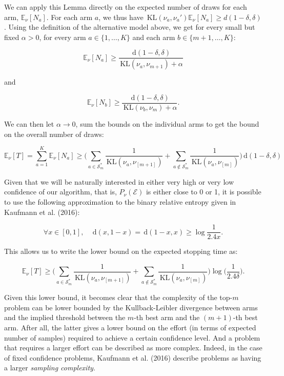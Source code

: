 \documentclass[11pt,]{article}
\newcommand{\KL}{\,\text{KL}}
\newcommand{\der}{\,\text{d}}
\begin{document}
We can apply this Lemma directly on the expected number of draws for
each arm, \(\mathbb{E}_{\nu}[N_a]\). For each arm \(a\), we thus have
\(\KL(\nu_a, \nu_a') \mathbb{E}_{\nu}[N_a] \geq d(1-\delta, \delta)\).
Using the definition of the alternative model above, we get for every
small but fixed \(\alpha > 0\), for every arm \(a \in \{1, \dots, K\}\)
and each arm \(b \in \{m+1, \dots, K\}\):

\begin{equation*}
\mathbb{E}_{\nu}[N_a] \geq \frac{\der(1-\delta, \delta)}{\KL (\nu_a, \nu_{m+1}) + \alpha}
\end{equation*}

and

\begin{equation*}
\mathbb{E}_{\nu}[N_b] \geq \frac{\der(1-\delta, \delta)}{\KL (\nu_b, \nu_{m}) + \alpha}.
\end{equation*}

We can then let \(\alpha \to 0\), sum the bounds on the individual arms
to get the bound on the overall number of draws:

\begin{equation*}
\mathbb{E}_{\nu}[T] = \sum_{a=1}^K \mathbb{E}_{\nu}[N_a] \geq \Big( \sum_{a \in \mathcal{S}_m^*} \frac{1}{\KL(\nu_a, \nu_{[m+1]})} + \sum_{a \notin \mathcal{S}_m^*} \frac{1}{\KL(\nu_a, \nu_{[m]})} \Big) \der(1-\delta, \delta)
\end{equation*}

Given that we will be naturally interested in either very high or very
low confidence of our algorithm, that is, \(P_\nu(\mathcal{E})\) is
either close to 0 or 1, it is possible to use the following
approximation to the binary relative entropy given in Kaufmann et al.
(2016):

\begin{equation}\label{bre_approx}
\forall x \in [0,1], \quad \der(x,1-x) = \der(1-x,x) \geq \log \frac{1}{2.4x}.
\end{equation}

This allows us to write the lower bound on the expected stopping time
as:

\begin{equation*}
\mathbb{E}_{\nu}[T] \geq \Big( \sum_{a \in \mathcal{S}_m^*} \frac{1}{\KL(\nu_a, \nu_{[m+1]})} + \sum_{a \notin \mathcal{S}_m^*} \frac{1}{\KL(\nu_a, \nu_{[m]})} \Big) \log \big(\frac{1}{2.4\delta} \big).
\end{equation*}

Given this lower bound, it becomes clear that the complexity of the
top-\(m\) problem can be lower bounded by the Kullback-Leibler
divergence between arms and the implied threshold between the \(m\)-th
best arm and the \((m+1)\)-th best arm. After all, the latter gives a
lower bound on the effort (in terms of expected number of samples)
required to achieve a certain confidence level. And a problem that
requires a larger effort can be described as more complex. Indeed, in
the case of fixed confidence problems, Kaufmann et al. (2016) describe
problems as having a larger \emph{sampling complexity}.
\end{document}
